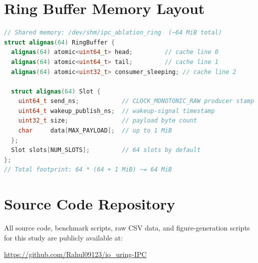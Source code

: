 \documentclass[10pt,conference]{IEEEtran}
\begin{document}
\appendix

\section*{Ring Buffer Memory Layout}

\begin{lstlisting}[language=C++]
// Shared memory: /dev/shm/ipc_ablation_ring  (~64 MiB total)
struct alignas(64) RingBuffer {
  alignas(64) atomic<uint64_t> head;         // cache line 0
  alignas(64) atomic<uint64_t> tail;         // cache line 1
  alignas(64) atomic<uint32_t> consumer_sleeping; // cache line 2

  struct alignas(64) Slot {
    uint64_t send_ns;            // CLOCK_MONOTONIC_RAW producer stamp
    uint64_t wakeup_publish_ns;  // wakeup-signal timestamp
    uint32_t size;               // payload byte count
    char     data[MAX_PAYLOAD];  // up to 1 MiB
  };
  Slot slots[NUM_SLOTS];         // 64 slots by default
};
// Total footprint: 64 * (64 + 1 MiB) ~= 64 MiB
\end{lstlisting}

\section*{Source Code Repository}

All source code, benchmark scripts, raw CSV data, and figure-generation
scripts for this study are publicly available at:

\begin{center}
\url{https://github.com/Rahul09123/io_uring-IPC}
\end{center}
\end{document}
